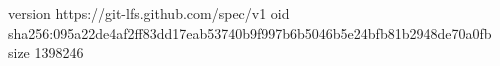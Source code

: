 version https://git-lfs.github.com/spec/v1
oid sha256:095a22de4af2ff83dd17eab53740b9f997b6b5046b5e24bfb81b2948de70a0fb
size 1398246
